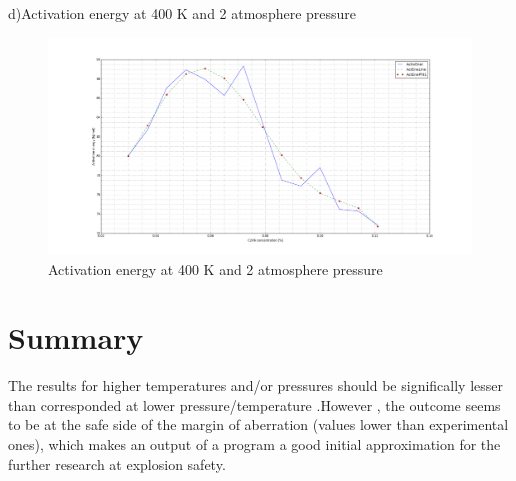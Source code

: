 \documentclass[a4paper]{article}
\begin{document}
\hspace{5,5mm} d)Activation energy  at 400 K and 2 atmosphere pressure

\begin{figure}[ht]
\includegraphics[width=1\textwidth]{figure_4.png}
\caption{Activation energy  at 400 K and 2 atmosphere pressure}
\end{figure}




\section{Summary}
The results for higher temperatures and/or pressures should be significally lesser than corresponded at lower pressure/temperature .However , the outcome seems to be at the safe side of the margin of aberration (values lower than experimental ones), which makes  an output of a program a good initial  approximation for the further research  at explosion safety.
\end{document}
